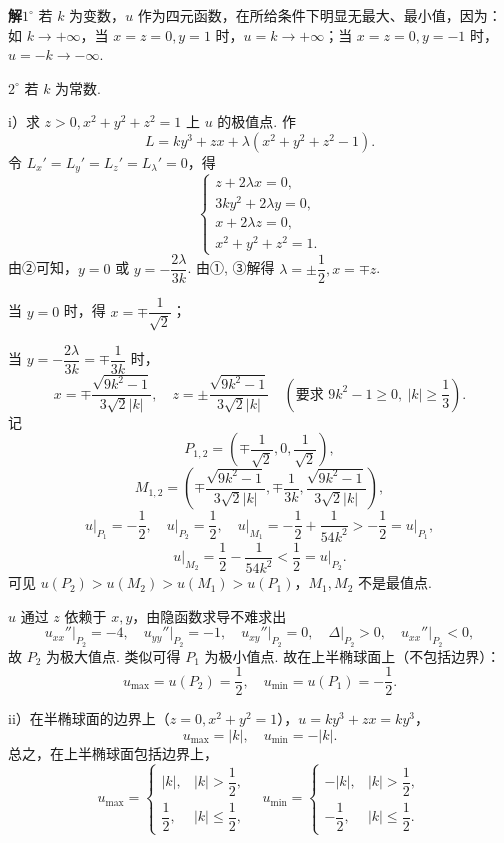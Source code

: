 \documentclass[UTF8, 12pt, fontset=fandol, oneside]{ctexart}
\begin{document}
\noindent\textbf{解}\quad $1^\circ$ 若 $k$ 为变数，$u$ 作为四元函数，在所给条件下明显无最大、最小值，因为：如 $k\to+\infty$，当 $x=z=0,y=1$ 时，$u=k\to+\infty$；当 $x=z=0,y=-1$ 时，$u=-k\to-\infty$.

$2^\circ$ 若 $k$ 为常数.

i）求 $z>0,x^2+y^2+z^2=1$ 上 $u$ 的极值点. 作
\[
  L=ky^3+zx+\lambda(x^2+y^2+z^2-1).
\]
令 $L_x'=L_y'=L_z'=L_\lambda'=0$，得
\[
  \begin{cases}
    z+2\lambda x=0,\\
    3ky^2+2\lambda y=0,\\
    x+2\lambda z=0,\\
    x^2+y^2+z^2=1.
  \end{cases}
\]
由②可知，$y=0$ 或 $y=-\dfrac{2\lambda}{3k}$. 由①, ③解得 $\lambda=\pm\dfrac12,x=\mp z$.

当 $y=0$ 时，得 $x=\mp\dfrac1{\sqrt2}$；

当 $y=-\dfrac{2\lambda}{3k}=\mp\dfrac1{3k}$ 时，
\[
  x=\mp\frac{\sqrt{9k^2-1}}{3\sqrt2|k|},\quad
  z=\pm\frac{\sqrt{9k^2-1}}{3\sqrt2|k|}
  \quad(\text{要求 }9k^2-1\ge0,\ |k|\ge\frac13).
\]
记
\[
  P_{1,2}=\left(\mp\frac1{\sqrt2},0,\frac1{\sqrt2}\right),
\]
\[
  M_{1,2}=\left(\mp\frac{\sqrt{9k^2-1}}{3\sqrt2|k|},
  \mp\frac1{3k},
  \frac{\sqrt{9k^2-1}}{3\sqrt2|k|}\right),
\]
\[
  u\big|_{P_1}=-\frac12,\quad
  u\big|_{P_2}=\frac12,\quad
  u\big|_{M_1}=-\frac12+\frac1{54k^2}>-\frac12=u\big|_{P_1},
\]
\[
  u\big|_{M_2}=\frac12-\frac1{54k^2}<\frac12=u\big|_{P_2}.
\]
可见 $u(P_2)>u(M_2)>u(M_1)>u(P_1)$，$M_1,M_2$ 不是最值点.

$u$ 通过 $z$ 依赖于 $x,y$，由隐函数求导不难求出
\[
  u_{xx}''\big|_{P_2}=-4,\quad
  u_{yy}''\big|_{P_2}=-1,\quad
  u_{xy}''\big|_{P_2}=0,\quad
  \Delta\big|_{P_2}>0,\quad
  u_{xx}''\big|_{P_2}<0,
\]
故 $P_2$ 为极大值点. 类似可得 $P_1$ 为极小值点. 故在上半椭球面上（不包括边界）：
\[
  u_{\max}=u(P_2)=\frac12,\quad
  u_{\min}=u(P_1)=-\frac12.
\]

ii）在半椭球面的边界上（$z=0,x^2+y^2=1$），$u=ky^3+zx=ky^3$，
\[
  u_{\max}=|k|,\quad u_{\min}=-|k|.
\]
总之，在上半椭球面包括边界上，
\[
  u_{\max}=
  \begin{cases}
    |k|, & |k|>\dfrac12,\\
    \dfrac12, & |k|\le\dfrac12,
  \end{cases}
  \quad
  u_{\min}=
  \begin{cases}
    -|k|, & |k|>\dfrac12,\\
    -\dfrac12, & |k|\le\dfrac12.
  \end{cases}
\]
\end{document}
